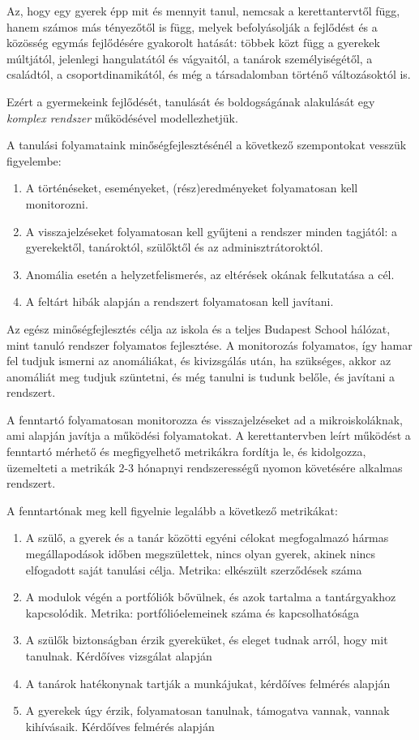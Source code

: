 Az, hogy egy gyerek épp mit és mennyit tanul, nemcsak a kerettantervtől függ, hanem számos más tényezőtől is függ, melyek befolyásolják a fejlődést és a közösség egymás fejlődésére gyakorolt hatását: többek közt függ a gyerekek múltjától, jelenlegi hangulatától és vágyaitól, a tanárok személyiségétől, a családtól, a csoportdinamikától, és még a társadalomban történő változásoktól is.

Ezért a gyermekeink fejlődését, tanulását és boldogságának alakulását egy \emph{komplex rendszer} működésével modellezhetjük.

A tanulási folyamataink minőségfejlesztésénél a következő szempontokat vesszük figyelembe:
\begin{enumerate}
\item  A történéseket, eseményeket, (rész)eredményeket folyamatosan kell monitorozni.
\item  A visszajelzéseket folyamatosan kell gyűjteni a rendszer minden tagjától: a gyerekektől, tanároktól, szülőktől és az adminisztrátoroktól.
\item Anomália esetén a helyzetfelismerés, az eltérések okának felkutatása a cél.
\item A feltárt hibák alapján a rendszert folyamatosan kell javítani.
\end{enumerate}

Az egész minőségfejlesztés célja az iskola és a teljes  Budapest School hálózat, mint tanuló rendszer folyamatos fejlesztése. A monitorozás folyamatos, így hamar fel tudjuk ismerni az anomáliákat, és kivizsgálás után, ha szükséges, akkor az anomáliát meg tudjuk szüntetni, és még tanulni is tudunk belőle, és javítani a rendszert.

A fenntartó folyamatosan monitorozza és visszajelzéseket ad a mikroiskoláknak, ami alapján javítja a működési folyamatokat. A kerettantervben leírt működést a fenntartó mérhető és megfigyelhető metrikákra fordítja le, és kidolgozza, üzemelteti a metrikák 2-3 hónapnyi rendszerességű nyomon követésére alkalmas rendszert.

A fenntartónak meg kell figyelnie legalább a következő metrikákat:
\begin{enumerate}
\item A szülő, a gyerek és a tanár közötti egyéni célokat megfogalmazó hármas megállapodások időben megszülettek, nincs olyan gyerek, akinek nincs elfogadott saját tanulási célja. Metrika: elkészült szerződések száma

\item A modulok végén a portfóliók bővülnek, és azok tartalma a tantárgyakhoz kapcsolódik. Metrika: portfólióelemeinek száma és kapcsolhatósága

\item A szülők biztonságban érzik gyereküket, és eleget tudnak arról, hogy mit tanulnak. Kérdőíves vizsgálat alapján

\item A tanárok hatékonynak tartják a munkájukat, kérdőíves felmérés alapján

\item A gyerekek úgy érzik, folyamatosan tanulnak, támogatva vannak, vannak kihívásaik. Kérdőíves felmérés alapján
\end{enumerate}

